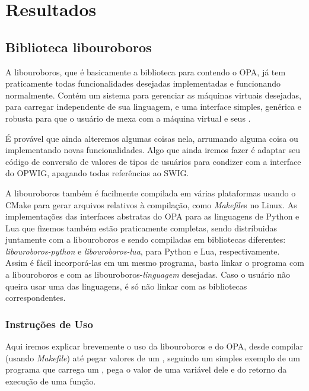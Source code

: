 \chapter{Resultados}
\label{sec:resultados}

\cite{xtr:00}

\section{Biblioteca \textbf{libouroboros}}
A libouroboros, que é basicamente a biblioteca para \CXX{} contendo o OPA,
já tem praticamente todas funcionalidades desejadas implementadas e
funcionando normalmente. Contém um sistema para gerenciar as máquinas
virtuais desejadas, para carregar  independente de sua
linguagem, e uma interface simples, genérica e robusta para
que o usuário de \CXX{} mexa com a máquina virtual e seus .

É provável que ainda alteremos algumas coisas nela, arrumando alguma
coisa ou implementando novas funcionalidades. Algo que ainda iremos
fazer é adaptar seu código de conversão de valores de tipos de usuários
para condizer com a interface do OPWIG, apagando todas referências ao
SWIG.

A libouroboros também é facilmente compilada em várias plataformas usando
o CMake para gerar arquivos relativos à compilação, como \textit{Makefile}s
no Linux. As implementações das interfaces abstratas do OPA para as linguagens
de \script{} Python e Lua que fizemos também estão praticamente completas,
sendo distríbuidas juntamente com a libouroboros e sendo compiladas em
bibliotecas diferentes: \emph{libouroboros-python} e \emph{libouroboros-lua},
para Python e Lua, respectivamente. Assim é fácil incorporá-las em um
mesmo programa, basta linkar o programa com a libouroboros e com as 
libouroboros-\textit{linguagem} desejadas. Caso o usuário não queira usar
uma das linguagens, é só não linkar com as bibliotecas correspondentes.

\subsection{Instruções de Uso}
Aqui iremos explicar brevemente o uso da libouroboros e do OPA, desde compilar
(usando \textit{Makefile}) até pegar valores de um \script{}, seguindo um 
simples exemplo de um programa que carrega um \script{}, pega o valor de uma
variável dele e do retorno da execução de uma função.

